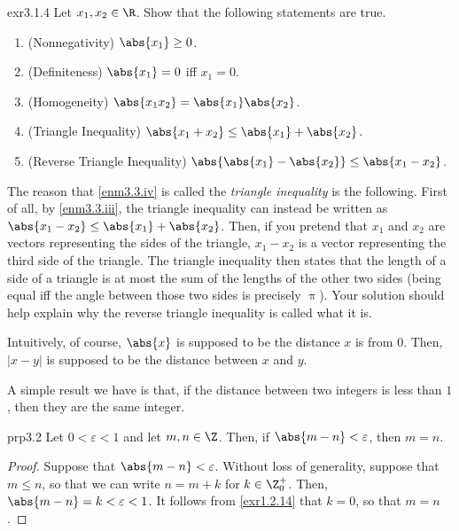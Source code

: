 \begin{exr}{}{exr3.1.4}
Let $x_1,x_2\in \R$.  Show that the following statements are true.
\begin{enumerate}
\item \label{enm3.3.i}(Nonnegativity) $\abs{x_1}\geq 0$.
\item \label{enm3.3.ii}(Definiteness) $\abs{x_1}=0$ iff $x_1=0$.
\item \label{enm3.3.iii}(Homogeneity) $\abs{x_1x_2}=\abs{x_1}\abs{x_2}$.
\item \label{enm3.3.iv}(Triangle Inequality) $\abs{x_1+x_2}\leq \abs{x_1}+\abs{x_2}$.
\item \label{enm3.3.v}(Reverse Triangle Inequality) $\abs{\abs{x_1}-\abs{x_2}}\leq \abs{x_1-x_2}$.
\end{enumerate}
\begin{rmk}
The reason that \cref{enm3.3.iv} is called the \emph{triangle inequality} is the following.  First of all, by \cref{enm3.3.iii}, the triangle inequality can instead be written as $\abs{x_1-x_2}\leq \abs{x_1}+\abs{x_2}$.  Then, if you pretend that $x_1$ and $x_2$ are vectors representing the sides of the triangle, $x_1-x_2$ is a vector representing the third side of the triangle.  The triangle inequality then states that the length of a side of a triangle is at most the sum of the lengths of the other two sides (being equal iff the angle between those two sides is precisely $\uppi$).  Your solution should help explain why the reverse triangle inequality is called what it is.
\end{rmk}
\end{exr}
Intuitively, of course, $\abs{x}$ is supposed to be the distance $x$ is from $0$.  Then, $|x-y|$ is supposed to be the distance between $x$ and $y$.

A simple result we have is that, if the distance between two integers is less than $1$, then they are the same integer.
\begin{prp}{}{prp3.2}
Let $0<\varepsilon <1$ and let $m,n\in \Z$.  Then, if $\abs{m-n}<\varepsilon$, then $m=n$.
\begin{proof}
Suppose that $\abs{m-n}<\varepsilon$.  Without loss of generality, suppose that $m\leq n$, so that we can write $n=m+k$ for $k\in \Z _0^+$.  Then, $\abs{m-n}=k<\varepsilon <1$.  It follows from \cref{exr1.2.14} that $k=0$, so that $m=n$.
\end{proof}
\end{prp}

